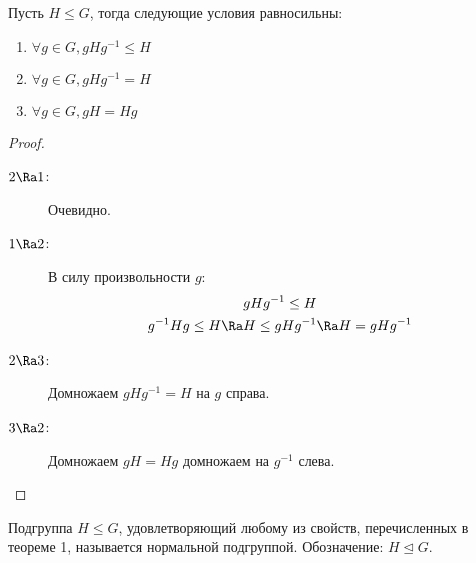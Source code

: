 \begin{theorem}
	Пусть $H \le G$, тогда следующие условия равносильны:
	\begin{enumerate}
		\item $\forall g \in G, gHg^{-1} \le H$
		\item $\forall g \in G, gHg^{-1} = H$
		\item $\forall g \in G, gH = Hg$
	\end{enumerate}
\end{theorem}
\begin{proof}\begin{description}
\item[$2 \Ra 1$:]
	Очевидно.

\item[$1 \Ra 2$:]
	В силу произвольности $g$:
	\begin{gather*}
		gHg^{-1} \le H \\
		g^{-1}Hg \le H \Ra H \le gHg^{-1} \Ra H = gHg^{-1}
	\end{gather*}

\item[$2 \Ra 3$:]
	Домножаем $gHg^{-1} = H$ на $g$ справа.

\item[$3 \Ra 2$:]
	Домножаем $gH = Hg$ домножаем на $g^{-1}$ слева.
\end{description}\end{proof}

\begin{Def}
	Подгруппа $H \le G$, удовлетворяющий любому из свойств, перечисленных в теореме 1, называется нормальной подгруппой.
	Обозначение: $H \unlhd G$.
\end{Def}

